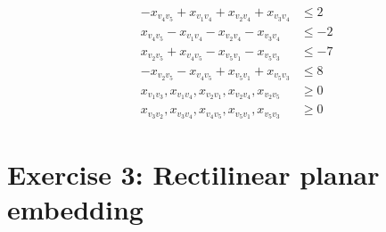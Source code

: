 \documentclass[11pt,a4paper]{article}
\begin{document}
\begin{align*}
             &  -x_{v_4v_5} + x_{v_1v_4} + x_{v_2v_4} + x_{v_3v_4} &\leq 2 \\
             &  x_{v_4v_5} - x_{v_1v_4} - x_{v_2v_4} - x_{v_3v_4}  &\leq -2 \\
             &  x_{v_2v_5} + x_{v_4v_5} - x_{v_5v_1} - x_{v_5v_3}  &\leq -7 \\ 
             &  -x_{v_2v_5} - x_{v_4v_5} + x_{v_5v_1} + x_{v_5v_3} &\leq 8 \\
             &  x_{v_1v_3}, x_{v_1v_4}, x_{v_2v_1}, x_{v_2v_4}, x_{v_2v_5} &\geq 0\\
             &  x_{v_3v_2}, x_{v_3v_4}, x_{v_4v_5}, x_{v_5v_1}, x_{v_5v_3} &\geq 0
\end{align*}

\section{Exercise 3: Rectilinear planar embedding}
\end{document}
